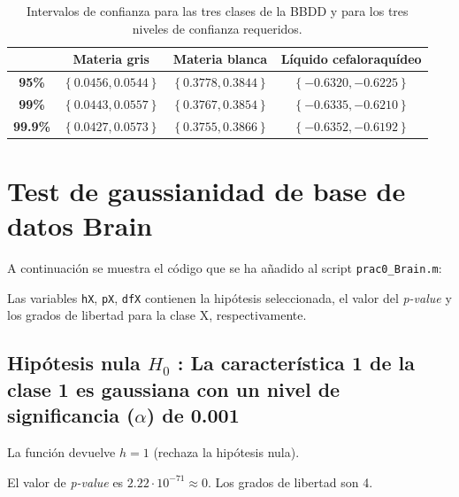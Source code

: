 \documentclass[11pt]{article} %
\begin{document}
\begin{table}[h]
	\begin{center}
		\begin{tabular}{| c | c | c | c |}
			\hline
			\diagbox[width=10em]{\textbf{Confianza}}{\textbf{Clase}} & \textbf{Materia gris} & \textbf{Materia blanca} & \textbf{Líquido cefaloraquídeo} \\
			\hline
			\textbf{95\%} & $ \left\lbrace 0.0456 , 0.0544 \right\rbrace $ & $ \left\lbrace 0.3778 , 0.3844 \right\rbrace $ & $ \left\lbrace -0.6320 , -0.6225 \right\rbrace $ \\
			\hline
			\textbf{99\%} & $ \left\lbrace 0.0443 , 0.0557 \right\rbrace $ & $ \left\lbrace 0.3767 , 0.3854 \right\rbrace $ & $ \left\lbrace -0.6335 , -0.6210 \right\rbrace $ \\
			\hline
			\textbf{99.9\%} & $ \left\lbrace 0.0427 , 0.0573 \right\rbrace $ & $ \left\lbrace 0.3755 , 0.3866 \right\rbrace $ & $ \left\lbrace -0.6352 , -0.6192 \right\rbrace $ \\
			\hline
		\end{tabular}
		\caption{Intervalos de confianza para las tres clases de la BBDD y para los tres niveles de confianza requeridos.}
		\label{tab:24:intervals}
	\end{center}
\end{table}

\section[Tests gausianidad]{Test de gaussianidad de base de datos Brain}

A continuación se muestra el código que se ha añadido al script \texttt{prac0\_Brain.m}:



Las variables \texttt{hX}, \texttt{pX}, \texttt{dfX} contienen la hipótesis seleccionada, el valor del \textit{p-value} y los grados de libertad para la clase X, respectivamente.

\subsection[1er caso]{Hipótesis nula $H_0$ : La característica 1 de la clase 1 es gaussiana con un nivel de significancia ($\alpha$) de 0.001}

La función devuelve $h = 1$ (rechaza la hipótesis nula). 

El valor de \textit{p-value} es $2.22 \cdot 10^{-71} \approx 0$. Los grados de libertad son 4. 
\end{document}
